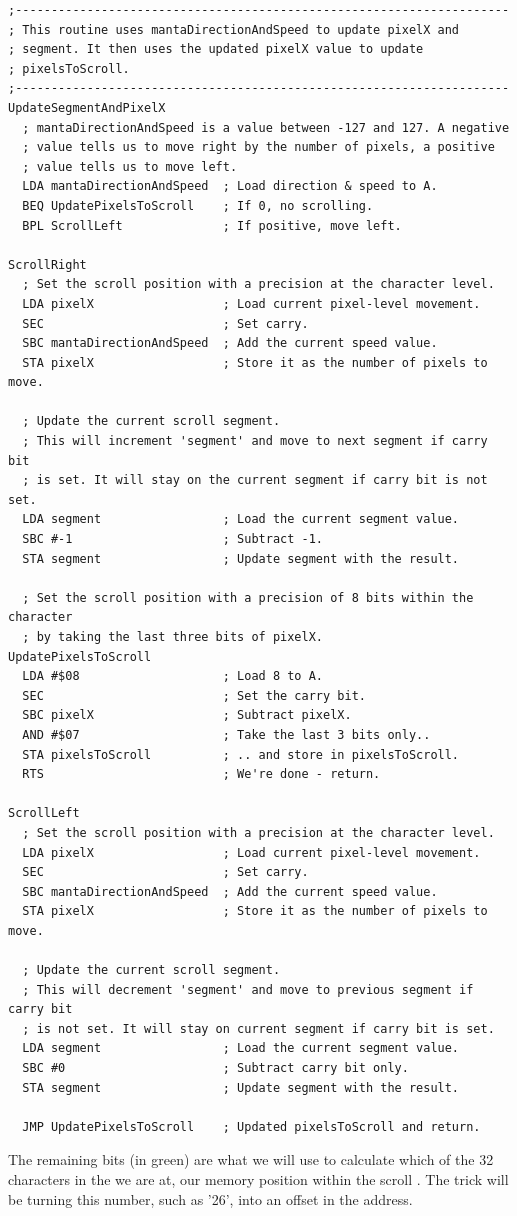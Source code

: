 \vspace*{\fill}
\begin{lstlisting}
;---------------------------------------------------------------------
; This routine uses mantaDirectionAndSpeed to update pixelX and
; segment. It then uses the updated pixelX value to update
; pixelsToScroll.
;---------------------------------------------------------------------
UpdateSegmentAndPixelX
  ; mantaDirectionAndSpeed is a value between -127 and 127. A negative
  ; value tells us to move right by the number of pixels, a positive
  ; value tells us to move left.
  LDA mantaDirectionAndSpeed  ; Load direction & speed to A.
  BEQ UpdatePixelsToScroll    ; If 0, no scrolling.
  BPL ScrollLeft              ; If positive, move left.

ScrollRight
  ; Set the scroll position with a precision at the character level.
  LDA pixelX                  ; Load current pixel-level movement.
  SEC                         ; Set carry.
  SBC mantaDirectionAndSpeed  ; Add the current speed value.
  STA pixelX                  ; Store it as the number of pixels to move.

  ; Update the current scroll segment.
  ; This will increment 'segment' and move to next segment if carry bit
  ; is set. It will stay on the current segment if carry bit is not set.
  LDA segment                 ; Load the current segment value.
  SBC #-1                     ; Subtract -1.
  STA segment                 ; Update segment with the result.

  ; Set the scroll position with a precision of 8 bits within the character
  ; by taking the last three bits of pixelX.
UpdatePixelsToScroll
  LDA #$08                    ; Load 8 to A.
  SEC                         ; Set the carry bit.
  SBC pixelX                  ; Subtract pixelX.
  AND #$07                    ; Take the last 3 bits only..
  STA pixelsToScroll          ; .. and store in pixelsToScroll.
  RTS                         ; We're done - return.

ScrollLeft
  ; Set the scroll position with a precision at the character level.
  LDA pixelX                  ; Load current pixel-level movement.
  SEC                         ; Set carry.
  SBC mantaDirectionAndSpeed  ; Add the current speed value.
  STA pixelX                  ; Store it as the number of pixels to move.

  ; Update the current scroll segment.
  ; This will decrement 'segment' and move to previous segment if carry bit
  ; is not set. It will stay on current segment if carry bit is set.
  LDA segment                 ; Load the current segment value.
  SBC #0                      ; Subtract carry bit only.
  STA segment                 ; Update segment with the result.

  JMP UpdatePixelsToScroll    ; Updated pixelsToScroll and return.
\end{lstlisting}
\vspace*{\fill}
\clearpage
The remaining bits (in green) are what we will use
to calculate which of the 32 characters in the  we are at, our memory
position within the scroll . The trick will be
turning this number, such as '26', into an offset in the  address.

